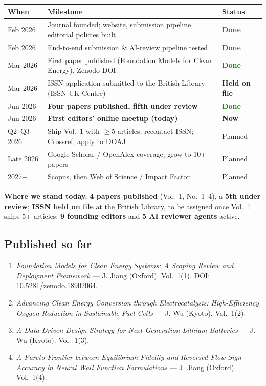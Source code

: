 \documentclass[11pt]{article}
\newcommand{\stat}[1]{{\sffamily\bfseries\color{accent}#1}}
\begin{document}
\renewcommand{\arraystretch}{1.25}
\begin{center}\small
\begin{tabular}{@{}p{2.4cm} p{8.6cm} p{2.6cm}@{}}
\toprule
\textbf{When} & \textbf{Milestone} & \textbf{Status} \\
\midrule
Feb 2026 & Journal founded; website, submission pipeline, editorial policies built & \textcolor{green}{\textbf{Done}} \\
Feb 2026 & End-to-end submission \& AI-review pipeline tested & \textcolor{green}{\textbf{Done}} \\
Mar 2026 & First paper published (Foundation Models for Clean Energy), Zenodo DOI & \textcolor{green}{\textbf{Done}} \\
Mar 2026 & ISSN application submitted to the British Library (ISSN UK Centre) & \textcolor{amber}{\textbf{Held on file}} \\
Jun 2026 & \textbf{Four papers published, fifth under review} & \textcolor{green}{\textbf{Done}} \\
Jun 2026 & \textbf{First editors' online meetup (today)} & \textcolor{accent}{\textbf{Now}} \\
Q2--Q3 2026 & Ship Vol.~1 with $\ge$5 articles; recontact ISSN; Crossref; apply to DOAJ & \textcolor{ink3}{Planned} \\
Late 2026 & Google Scholar / OpenAlex coverage; grow to 10+ papers & \textcolor{ink3}{Planned} \\
2027+ & Scopus, then Web of Science / Impact Factor & \textcolor{ink3}{Planned} \\
\bottomrule
\end{tabular}
\end{center}

\textbf{Where we stand today.} \stat{4 papers published} (Vol.~1, No.~1--4), a \stat{5th under review}; \stat{ISSN held on file} at the British Library, to be assigned once Vol.~1 ships 5+ articles; \stat{9 founding editors} and \stat{5 AI reviewer agents} active.

\subsection*{Published so far}
\begin{enumerate}
\item \emph{Foundation Models for Clean Energy Systems: A Scoping Review and Deployment Framework} --- J. Jiang (Oxford). Vol.~1(1). DOI: 10.5281/zenodo.18902064.
\item \emph{Advancing Clean Energy Conversion through Electrocatalysis: High-Efficiency Oxygen Reduction in Sustainable Fuel Cells} --- J. Wu (Kyoto). Vol.~1(2).
\item \emph{A Data-Driven Design Strategy for Next-Generation Lithium Batteries} --- J. Wu (Kyoto). Vol.~1(3).
\item \emph{A Pareto Frontier between Equilibrium Fidelity and Reversed-Flow Sign Accuracy in Neural Wall Function Formulations} --- J. Jiang (Oxford). Vol.~1(4).
\end{enumerate}
\end{document}
